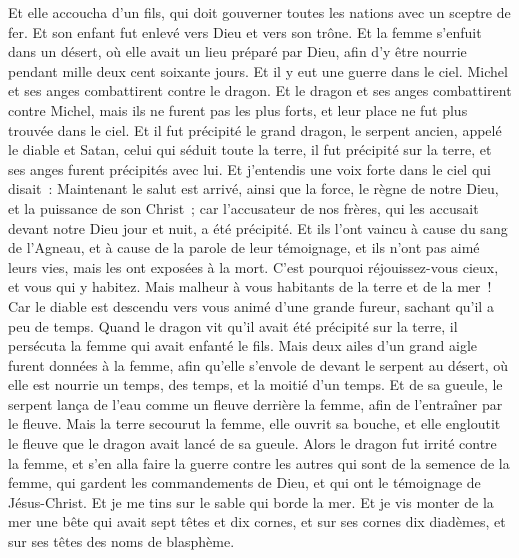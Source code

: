 \begin{multicols}{2}
Et elle accoucha d'un fils, qui doit gouverner toutes les nations avec un sceptre de fer. Et son enfant fut enlevé vers Dieu et vers son trône.
Et la femme s'enfuit dans un désert, où elle avait un lieu préparé par Dieu, afin d'y être nourrie pendant mille deux cent soixante jours.
Et il y eut une guerre dans le ciel. Michel et ses anges combattirent contre le dragon. Et le dragon et ses anges combattirent contre Michel,
mais ils ne furent pas les plus forts, et leur place ne fut plus trouvée dans le ciel.
Et il fut précipité le grand dragon, le serpent ancien, appelé le diable et Satan, celui qui séduit toute la terre, il fut précipité sur la terre, et ses anges furent précipités avec lui.
Et j'entendis une voix forte dans le ciel qui disait~: Maintenant le salut est arrivé, ainsi que la force, le règne de notre Dieu, et la puissance de son Christ~; car l'accusateur de nos frères, qui les accusait devant notre Dieu jour et nuit, a été précipité.
Et ils l'ont vaincu à cause du sang de l'Agneau, et à cause de la parole de leur témoignage, et ils n'ont pas aimé leurs vies, mais les ont exposées à la mort.
C'est pourquoi réjouissez-vous cieux, et vous qui y habitez. Mais malheur à vous habitants de la terre et de la mer~! Car le diable est descendu vers vous animé d'une grande fureur, sachant qu'il a peu de temps.
Quand le dragon vit qu'il avait été précipité sur la terre, il persécuta la femme qui avait enfanté le fils.
Mais deux ailes d'un grand aigle furent données à la femme, afin qu'elle s'envole de devant le serpent au désert, où elle est nourrie un temps, des temps, et la moitié d'un temps.
Et de sa gueule, le serpent lança de l'eau comme un fleuve derrière la femme, afin de l'entraîner par le fleuve.
Mais la terre secourut la femme, elle ouvrit sa bouche, et elle engloutit le fleuve que le dragon avait lancé de sa gueule.
Alors le dragon fut irrité contre la femme, et s'en alla faire la guerre contre les autres qui sont de la semence de la femme, qui gardent les commandements de Dieu, et qui ont le témoignage de Jésus-Christ.
Et je me tins sur le sable qui borde la mer.
\VerseOne{}Et je vis monter de la mer une bête qui avait sept têtes et dix cornes, et sur ses cornes dix diadèmes, et sur ses têtes des noms de blasphème.

\end{multicols}
